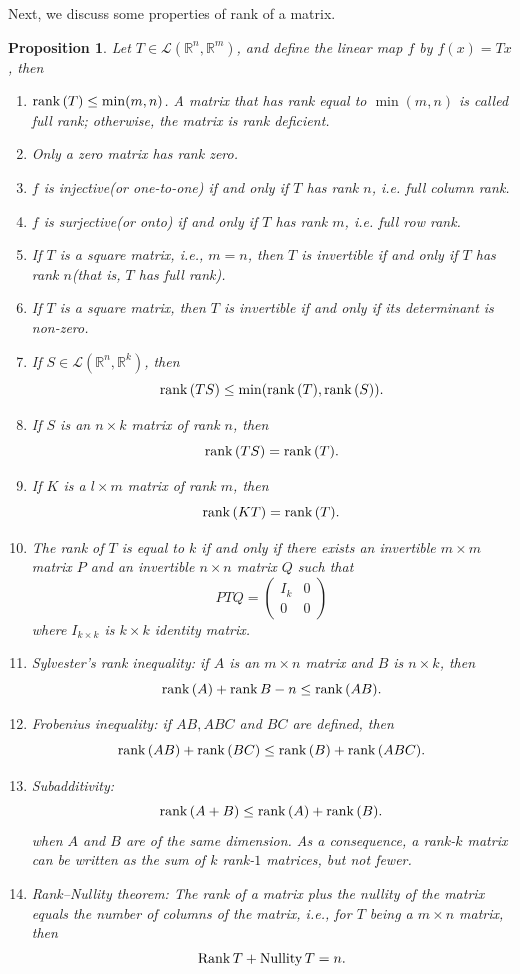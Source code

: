 \documentclass[11pt]{book}
\newtheorem{proposition}{Proposition}[section]
\theoremstyle{definition}
\numberwithin{equation}{chapter}
\begin{document}
Next, we discuss some properties of rank of a matrix.
\begin{proposition}
Let $T\in\mathscr{L}(\mathbb{R}^n,\mathbb{R}^m)$, and define the linear map $f$ by $f(x) = Tx$, then
\begin{enumerate}[label=(\alph*)]
    \item ${\rm rank}\,(T)\leq \min(m,n)$. A matrix that has rank equal to $\min(m, n)$ is called full rank; otherwise, the matrix is rank deficient.
    \item Only a zero matrix has rank zero.
    \item $f$ is injective(or one-to-one) if and only if $T$ has rank $n$, i.e. full column rank.
    \item $f$ is surjective(or onto) if and only if $T$ has rank $m$, i.e. full row rank.
    \item If $T$ is a square matrix, i.e., $m = n$, then $T$ is invertible if and only if $T$ has rank $n$(that is, $T$ has full rank).
    \item If $T$ is a square matrix, then $T$ is invertible if and only if its determinant is non-zero.
    \item If $S\in\mathscr{L}(\mathbb{R}^n,\mathbb{R}^k)$, then $${\rm rank}\,(TS) \leq \min( {\rm rank}\,(T), {\rm rank}\,(S)).$$
    \item If $S$ is an $n\times k$ matrix of rank $n$, then $${\rm rank}\,(TS) = {\rm rank}\,(T).$$
    \item If $K$ is a $l\times m$ matrix of rank $m$, then$${\rm rank}\,(KT) = {\rm rank}\,(T).$$
    \item The rank of $T$ is equal to $k$ if and only if there exists an invertible $m\times m$ matrix $P$ and an invertible $n\times n$ matrix $Q$ such that
    $$PTQ = \left(
        \begin{matrix}
        I_{k} & 0 \\
        0 & 0
        \end{matrix}
    \right)$$
    where $I_{k\times k}$ is $k\times k$ identity matrix.
    \item Sylvester’s rank inequality: if $A$ is an $m\times n$ matrix and $B$ is $n\times k$, then
    $${\rm rank}\,(A) + {\rm rank}\,B - n \leq {\rm rank}\,(AB).$$
    \item Frobenius inequality: if $AB, ABC$ and $BC$ are defined, then
    $${\rm rank}\,(AB) + {\rm rank}\,(BC) \leq {\rm rank}\,(B) + {\rm rank}\,(ABC).$$
    \item Subadditivity:
    $${\rm rank}\, (A+B)\leq {\rm rank}\, (A)+{\rm rank}\, (B).$$
    when $A$ and $B$ are of the same dimension. As a consequence, a rank-$k$ matrix can be written as the sum of $k$ rank-$1$ matrices, but not fewer.
    \item Rank–Nullity theorem: The rank of a matrix plus the nullity of the matrix equals the number of columns of the matrix, i.e., for $T$ being a $m\times n$ matrix, then $${\rm Rank}\, T + {\rm Nullity}\, T = n.$$
\end{enumerate}
\end{proposition}
\end{document}
